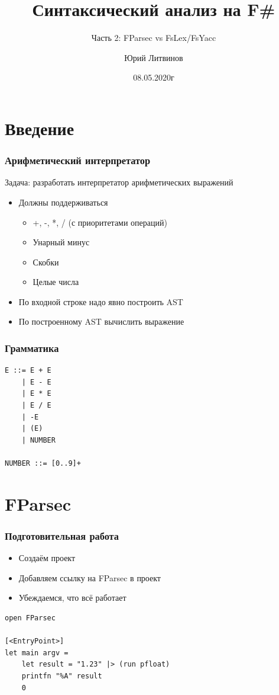\documentclass[xetex,mathserif,serif]{beamer}
\title{Синтаксический анализ на F\#}
\subtitle{Часть 2: FParsec vs FsLex/FsYacc}
\author{Юрий Литвинов}
\date{08.05.2020г}
\begin{document}
    
    \frame{\titlepage}

    \section{Введение}
    
    \begin{frame}
        \frametitle{Арифметический интерпретатор}
        Задача: разработать интерпретатор арифметических выражений
        \begin{itemize}
            \item Должны поддерживаться 
            \begin{itemize}
                \item +, -, *, / (с приоритетами операций)
                \item Унарный минус
                \item Скобки
                \item Целые числа
            \end{itemize}
            \item По входной строке надо явно построить AST
            \item По построенному AST вычислить выражение
        \end{itemize}
    \end{frame}

    \begin{frame}[fragile]
        \frametitle{Грамматика}
        \begin{verbatim}
E ::= E + E
    | E - E
    | E * E
    | E / E
    | -E
    | (E)
    | NUMBER

NUMBER ::= [0..9]+
        \end{verbatim}
    \end{frame}

    \section{FParsec}

    \begin{frame}[fragile]
        \frametitle{Подготовительная работа}
        \begin{itemize}
            \item Создаём проект
            \item Добавляем ссылку на FParsec в проект
            \item Убеждаемся, что всё работает
        \end{itemize}
        \begin{verbatim}
open FParsec

[<EntryPoint>]
let main argv =
    let result = "1.23" |> (run pfloat)
    printfn "%A" result
    0 
        \end{verbatim}
    \end{frame}
\end{document}
